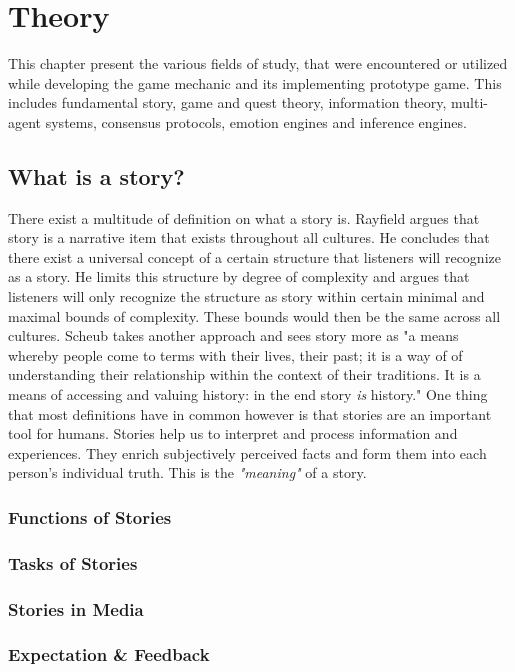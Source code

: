 \chapter{Theory} %
This chapter present the various fields of study, that were encountered or utilized while developing the game mechanic and its implementing prototype game. This includes fundamental story, game and quest theory, information theory, multi-agent systems, consensus protocols, emotion engines and inference engines.
\section{What is a story?}
There exist a multitude of definition on what a story is. Rayfield argues that story is a narrative item that exists throughout all cultures. He concludes that there exist a universal concept of a certain structure that listeners will recognize as a story. He limits this structure by degree of complexity and argues that listeners will only recognize the structure as story within certain minimal and maximal bounds of complexity. These bounds would then be the same across all cultures. \cite{Rayfield1972} Scheub takes another approach and sees story more as "a means whereby people come to terms with their lives, their past; it is a way of of understanding their relationship within the context of their traditions. It is a means of accessing and valuing history: in the end story \textit{is} history." \cite{Scheub1998} One thing that most definitions have in common however is that stories are an important tool for humans. Stories help us to interpret and process information and experiences. They enrich subjectively perceived facts and form them into each person's individual truth. This is the \textit{"meaning"} of a story.

\subsection{Functions of Stories}
\subsection{Tasks of Stories}
\subsection{Stories in Media}
\subsection{Expectation \& Feedback}
